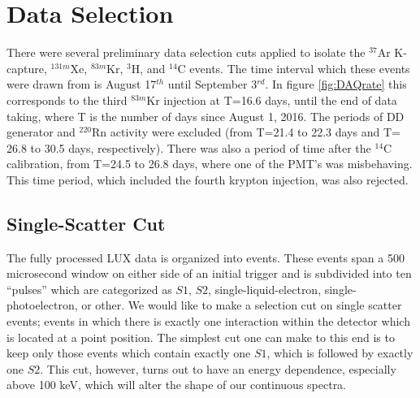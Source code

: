 {\section{Data Selection}\label{sec:cuts}
There were several preliminary data selection cuts applied to isolate the $^{37}$Ar K-capture, $^{131m}$Xe, $^{83m}$Kr, $^{3}$H, and $^{14}$C events. The time interval which these events were drawn from is  August 17$^{th}$ until September 3$^{rd}$. In figure \ref{fig:DAQrate} this corresponds to the third $^{83m}$Kr injection at T=16.6 days, until the end of data taking, where T is the number of days since August 1, 2016. The periods of DD generator and $^{220}$Rn activity were excluded (from T=21.4 to 22.3 days and T= 26.8 to 30.5 days, respectively). There was also a period of time after the $^{14}$C calibration, from T=24.5 to 26.8 days, where one of the PMT's was misbehaving. This time period, which included the fourth krypton injection, was also rejected.

\subsection{Single-Scatter Cut}\label{sec:sscut}
The fully processed LUX data is organized into events. These events span a 500 microsecond window on either side of an initial trigger and is subdivided into ten ``pulses'' which are categorized as $S1$, $S2$, single-liquid-electron, single-photoelectron, or other. We would like to make a selection cut on single scatter events; events in which there is exactly one interaction within the detector which is located at a point position. The simplest cut one can make to this end is to keep only those events which contain exactly one $S1$, which is followed by exactly one $S2$. This cut, however, turns out to have an energy dependence, especially above 100 keV, which will alter the shape of our continuous spectra. 

}
